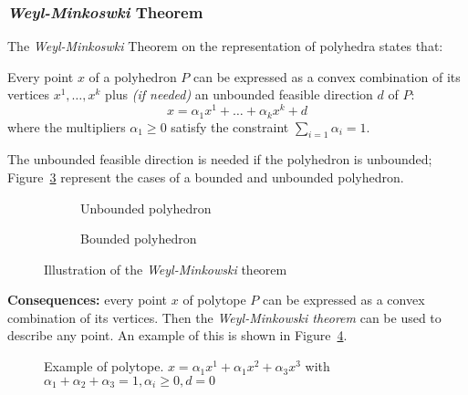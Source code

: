 \documentclass[english]{article}
\begin{document}
\subsubsection{\textit{Weyl-Minkoswki} Theorem}

The \textit{Weyl-Minkoswki} Theorem on the representation of polyhedra states that:

\begin{theorem}
  Every point \(x\) of a polyhedron \(P\) can be expressed as a convex combination of its vertices \(x^1, \ldots, x^k\) plus \textit{(if needed)} an unbounded feasible direction \(d\) of \(P\):
  \[ x = \alpha_1 x^1 + \ldots + \alpha_k x^k + d \]
  where the multipliers \(\alpha_1 \geq 0\) satisfy the constraint \(\displaystyle\sum_{i=1} \alpha_i = 1\).
\end{theorem}

\bigskip
The unbounded feasible direction is needed if the polyhedron is unbounded; Figure~\ref{fig:weyl-minkowski-theorem} represent the cases of a bounded and unbounded polyhedron.

\begin{figure}[htbp]
  \centering
  \bigskip
  \begin{subfigure}[h]{0.495\textwidth}
    \centering
    \bigskip
    \caption{Unbounded polyhedron}
    \label{subfig:unbounded-polyhedron}
    \bigskip
  \end{subfigure}
  \begin{subfigure}[h]{0.495\textwidth}
    \centering
    \bigskip
    \caption{Bounded polyhedron}
    \label{subfig:bounded-polyhedron}
    \bigskip
  \end{subfigure}
  \caption{Illustration of the \textit{Weyl-Minkowski} theorem}
  \label{fig:weyl-minkowski-theorem}
  \bigskip
\end{figure}

\textbf{Consequences:}
every point \(x\) of polytope \(P\) can be expressed as a convex combination of its vertices.
Then the \textit{Weyl-Minkowski theorem} can be used to describe any point.
An example of this is shown in Figure~\ref{fig:polytope-example}.

\begin{figure}[htbp]
  \bigskip
  \centering
  \caption{Example of polytope. \(x = \alpha_1 x^1 + \alpha_1 x^2 + \alpha_3 x^3\) with \(\alpha_1 + \alpha_2 + \alpha_3 = 1, \alpha_i \geq 0, d = 0\)}
  \label{fig:polytope-example}
  \bigskip
\end{figure}
\end{document}
